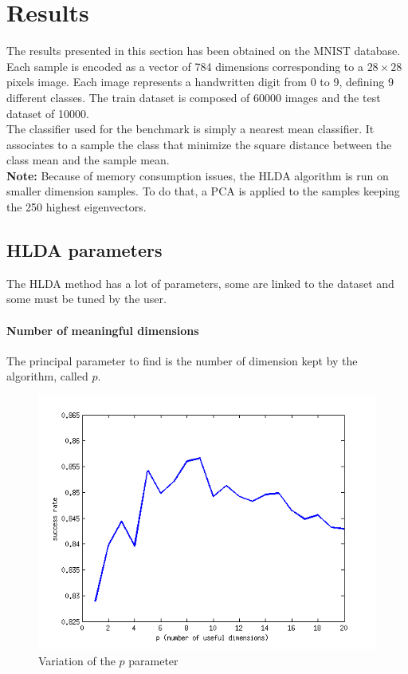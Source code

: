 
\section{Results}
\label{sec:results}

The results presented in this section has been obtained on the MNIST database.
Each sample is encoded as a vector of 784 dimensions corresponding to a $28 \times 28$
pixels image. Each image represents a handwritten digit from 0 to 9, defining 9 different
classes.
The train dataset is composed of 60000 images and the test dataset of 10000.\\

The classifier used for the benchmark is simply a nearest mean classifier.
It associates to a sample the class that minimize the square distance between the class mean and
the sample mean.\\

{\bf Note:} Because of memory consumption issues, the HLDA algorithm is
run on smaller dimension samples. To do that, a PCA is applied to the samples keeping the
250 highest eigenvectors.

\subsection{HLDA parameters}

The HLDA method has a lot of parameters, some are linked to the dataset and some must be tuned
by the user.

\paragraph{Number of meaningful dimensions} The principal parameter to find is the number of dimension kept
by the algorithm, called $p$.

\begin{figure}[H!]
  \includegraphics[scale=0.75]{img/bench-classes}
  \caption{Variation of the $p$ parameter}
  \label{img:classes}
\end{figure}

